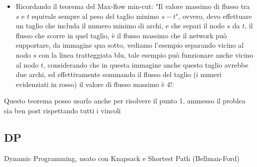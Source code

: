 \documentclass{article}
\begin{document}
\begin{itemize}
\item Ricordando il teorema del Max-flow min-cut: "Il valore massimo di flusso tra $s$ e $t$ equivale sempre al peso del taglio minimo $s-t$", ovvero, devo effettuare un taglio che includa il numero minimo di archi, e che separi il nodo $s$ da $t$, il flusso che scorre in quel taglio, è il flusso massimo che il network può supportare, da immagine qua sotto, vediamo l'esempio separando vicino al nodo $s$ con la linea tratteggiata blu, tale esempio può funzionare anche vicino al nodo $t$, considerando che in questa immagine anche questo taglio avrebbe due archi, ed effettivamente sommando il flusso del taglio (i numeri evidenziati in rosso) il valore di flusso massimo è $4$!:
\begin{center}
\end{center}
\end{itemize}
Questo teorema posso usarlo anche per risolvere il punto 1, ammesso il problea sia ben post rispettando tutti i vincoli
\newpage
\subsection{DP}
Dynamic Programming, usato con Knapsack e Shortest Path (Bellman-Ford)
\end{document}
